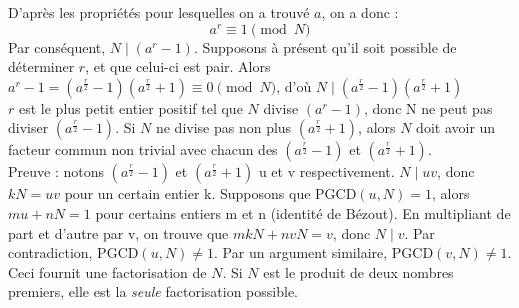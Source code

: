 \documentclass[12pt]{article}
\begin{document}
D'après les propriétés pour lesquelles on a trouvé $a$, on a donc :
$$a^r \equiv 1 \pmod N$$
Par conséquent, $N \mid (a^r -1)$. Supposons à présent qu'il soit possible de déterminer $r$, et que celui-ci est pair. Alors
\\
$a^r -1 = (a^{\frac{r}{2}} -1)(a^{\frac{r}{2}}+1) \equiv 0 \pmod N$, d'où $N \mid (a^{\frac{r}{2}} -1)(a^{\frac{r}{2}}+1)$
\\
$r$ est le plus petit entier positif tel que $N$ divise $(a^r -1)$, donc N ne peut pas diviser $(a^{\frac{r}{2}}-1)$. Si $N$ ne divise pas non plus $(a^{\frac{r}{2}}+1)$, alors $N$ doit avoir un facteur commun non trivial avec chacun des $(a^{\frac{r}{2}}-1)$ et $(a^{\frac{r}{2}}+1)$.
\\
Preuve : notons $(a^{\frac{r}{2}}-1)$ et $(a^{\frac{r}{2}}+1)$ u et v respectivement. $N \mid uv$, donc $kN=uv$ pour un certain entier k. Supposons que PGCD$(u, N)=1$, alors $mu +nN=1$ pour certains entiers m et n (identité de Bézout). En multipliant de part et d'autre par v, on trouve que $mkN + nvN=v$, donc $N \mid v$. Par contradiction, PGCD$(u, N)\neq 1$. Par un argument similaire, PGCD$(v, N) \neq 1$.
\\
Ceci fournit une factorisation de $N$. Si $N$ est le produit de deux nombres premiers, elle est la \textit{seule} factorisation possible.
\end{document}
